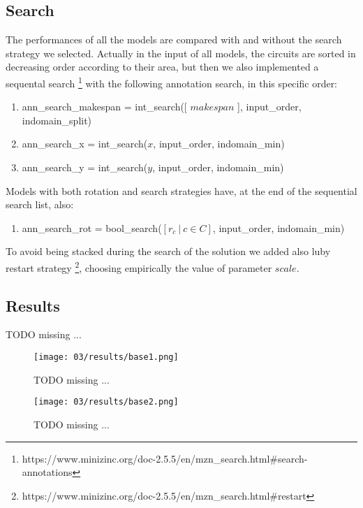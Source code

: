 
\subsection{Search}
The performances of all the models are compared with and without the search strategy we selected.
Actually in the input of all models, the circuits are sorted in decreasing order according to their area,
but then we also implemented a sequental search
\footnote[2]{https://www.minizinc.org/doc-2.5.5/en/mzn\_search.html\#search-annotations}
with the following annotation search, in this specific order:
\begin{enumerate}
  \item ann\_search\_makespan = int\_search([ $makespan$ ], input\_order, indomain\_split)
  \item ann\_search\_x = int\_search($x$, input\_order, indomain\_min)
  \item ann\_search\_y = int\_search($y$, input\_order, indomain\_min)
\end{enumerate}

Models with both rotation and search strategies have, at the end of the sequential search
list, also:
\begin{enumerate}[resume]
  \item ann\_search\_rot = bool\_search($[r_c\ |\ c \in C]$, input\_order, indomain\_min)
\end{enumerate}

To avoid being stacked during the search of the solution we added also luby restart strategy
\footnote[3]{https://www.minizinc.org/doc-2.5.5/en/mzn\_search.html\#restart},
choosing empirically the value of parameter $scale$.






\subsection{Results}
  \colorbox{BurntOrange}{TODO missing ...}

  \begin{figure}[H]
    \centering
    \texttt{[image: 03/results/base1.png]}
    \caption{
      \colorbox{BurntOrange}{TODO missing ...}
    }
    \label{fig:CP_results_base1}
  \end{figure}
  \begin{figure}[H]
    \centering
    \texttt{[image: 03/results/base2.png]}
    \caption{
      \colorbox{BurntOrange}{TODO missing ...}
    }
    \label{fig:CP_results_base2}
  \end{figure}

